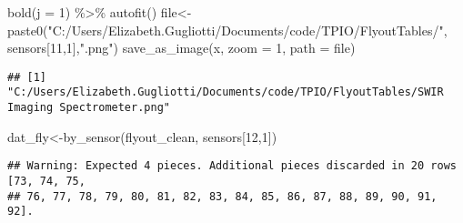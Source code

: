 \documentclass[
]{article}
\newenvironment{Shaded}{\begin{snugshade}}{\end{snugshade}}
\newcommand{\AttributeTok}[1]{\textcolor[rgb]{0.77,0.63,0.00}{#1}}
\newcommand{\DecValTok}[1]{\textcolor[rgb]{0.00,0.00,0.81}{#1}}
\newcommand{\FunctionTok}[1]{\textcolor[rgb]{0.00,0.00,0.00}{#1}}
\newcommand{\NormalTok}[1]{#1}
\newcommand{\OtherTok}[1]{\textcolor[rgb]{0.56,0.35,0.01}{#1}}
\newcommand{\SpecialCharTok}[1]{\textcolor[rgb]{0.00,0.00,0.00}{#1}}
\newcommand{\StringTok}[1]{\textcolor[rgb]{0.31,0.60,0.02}{#1}}
\begin{document}
\begin{Shaded}
\begin{Highlighting}[]
    \FunctionTok{bold}\NormalTok{(}\AttributeTok{j =} \DecValTok{1}\NormalTok{) }\SpecialCharTok{\%\textgreater{}\%} \FunctionTok{autofit}\NormalTok{()}
\NormalTok{file}\OtherTok{\textless{}{-}}\FunctionTok{paste0}\NormalTok{(}\StringTok{"C:/Users/Elizabeth.Gugliotti/Documents/code/TPIO/FlyoutTables/"}\NormalTok{, sensors[}\DecValTok{11}\NormalTok{,}\DecValTok{1}\NormalTok{],}\StringTok{".png"}\NormalTok{)}
\FunctionTok{save\_as\_image}\NormalTok{(x, }\AttributeTok{zoom =} \DecValTok{1}\NormalTok{, }\AttributeTok{path =}\NormalTok{ file)}
\end{Highlighting}
\end{Shaded}

\begin{verbatim}
## [1] "C:/Users/Elizabeth.Gugliotti/Documents/code/TPIO/FlyoutTables/SWIR Imaging Spectrometer.png"
\end{verbatim}

\begin{Shaded}
\begin{Highlighting}[]
\NormalTok{dat\_fly}\OtherTok{\textless{}{-}}\FunctionTok{by\_sensor}\NormalTok{(flyout\_clean, sensors[}\DecValTok{12}\NormalTok{,}\DecValTok{1}\NormalTok{])}
\end{Highlighting}
\end{Shaded}

\begin{verbatim}
## Warning: Expected 4 pieces. Additional pieces discarded in 20 rows [73, 74, 75,
## 76, 77, 78, 79, 80, 81, 82, 83, 84, 85, 86, 87, 88, 89, 90, 91, 92].
\end{verbatim}
\end{document}
